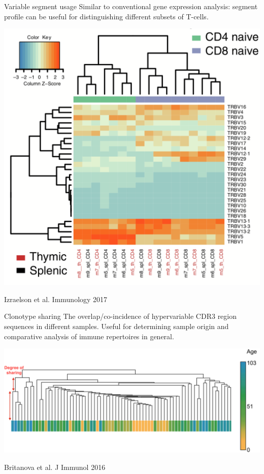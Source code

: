 \documentclass[12pt]{beamer}
\begin{document}
\begin{frame}{Variable segment usage}
Similar to conventional gene expression analysis: segment profile can be useful for distinguishing different subsets of T-cells.
\begin{center}
\includegraphics[scale=0.3]{p11}
\end{center}
\tiny{Izraelson et al. Immunology 2017}
\end{frame}

\begin{frame}{Clonotype sharing}
The overlap/co-incidence of hypervariable CDR3 region sequences in different samples. Useful for determining sample origin and comparative analysis of immune repertoires in general.
\begin{center}
\includegraphics[scale=0.35]{p12}
\end{center}
\tiny{Britanova et al. J Immunol 2016}
\end{frame}
\end{document}
